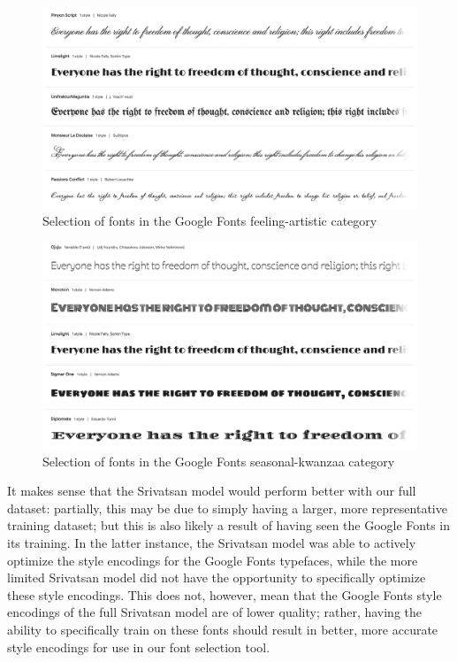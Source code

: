 \begin{figure}[p]
    \centering
    \includegraphics[width=\textwidth]{images/feeling-artistic.png}
    \caption{Selection of fonts in the Google Fonts feeling-artistic category}
    \label{fig:feeling-artistic}
\end{figure}

\begin{figure}[p]
    \centering
    \includegraphics[width=\textwidth]{images/seasonal-kwanzaa.png}
    \caption{Selection of fonts in the Google Fonts seasonal-kwanzaa category}
    \label{fig:seasonal-kwanzaa}
\end{figure}

It makes sense that the Srivatsan model would perform better with our full dataset: partially, this may be due to simply having a larger, more representative training dataset; but this is also likely a result of having seen the Google Fonts in its training. In the latter instance, the Srivatsan model was able to actively optimize the style encodings for the Google Fonts typefaces, while the more limited Srivatsan model did not have the opportunity to specifically optimize these style encodings. This does not, however, mean that the Google Fonts style encodings of the full Srivatsan model are of lower quality; rather, having the ability to specifically train on these fonts should result in better, more accurate style encodings for use in our font selection tool.

